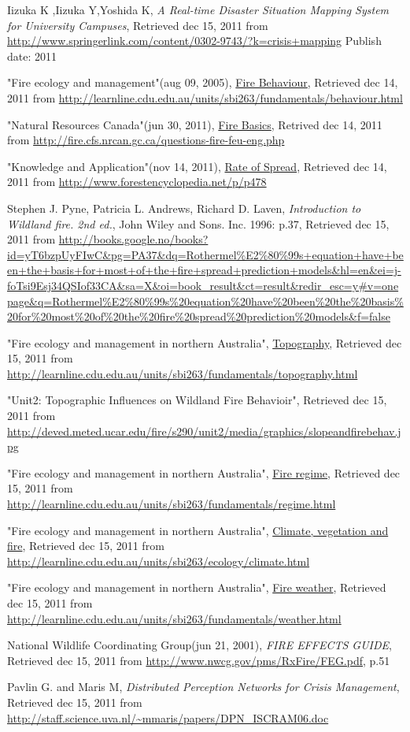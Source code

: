 \begin{thebibliography}{4}
 Iizuka K ,Iizuka Y,Yoshida K, \emph{A Real-time Disaster Situation Mapping System for University Campuses}, Retrieved dec 15, 2011 from \url{http://www.springerlink.com/content/0302-9743/?k=crisis+mapping} Publish date: 2011

 "Fire ecology and management"(aug 09, 2005), \underline{Fire Behaviour}, Retrieved dec 14, 2011 from \url{http://learnline.cdu.edu.au/units/sbi263/fundamentals/behaviour.html}

 "Natural Resources Canada"(jun 30, 2011), \underline{Fire Basics}, Retrived dec 14, 2011 from \url{http://fire.cfs.nrcan.gc.ca/questions-fire-feu-eng.php}

 "Knowledge and Application"(nov 14, 2011), \underline{Rate of Spread}, Retrieved dec 14, 2011 from \url{http://www.forestencyclopedia.net/p/p478}

 Stephen J. Pyne, Patricia L. Andrews, Richard D. Laven, \emph{Introduction to Wildland fire. 2nd ed.}, John Wiley and Sons. Inc. 1996: p.37, Retrieved dec 15, 2011 from
\url{http://books.google.no/books?id=yT6bzpUyFIwC&pg=PA37&dq=Rothermel%E2%80%99s+equation+have+been+the+basis+for+most+of+the+fire+spread+prediction+models&hl=en&ei=j-foTsi9Esj34QSIof33CA&sa=X&oi=book_result&ct=result&redir_esc=y#v=onepage&q=Rothermel%E2%80%99s%20equation%20have%20been%20the%20basis%20for%20most%20of%20the%20fire%20spread%20prediction%20models&f=false}

 "Fire ecology and management in northern Australia", \underline{Topography}, Retrieved dec 15, 2011 from \url{http://learnline.cdu.edu.au/units/sbi263/fundamentals/topography.html}

 "Unit2: Topographic Influences on Wildland Fire Behavioir", Retrieved dec 15, 2011 from \url{http://deved.meted.ucar.edu/fire/s290/unit2/media/graphics/slopeandfirebehav.jpg}

 "Fire ecology and management in northern Australia", \underline{Fire regime}, Retrieved dec 15, 2011 from \url{http://learnline.cdu.edu.au/units/sbi263/fundamentals/regime.html}

 "Fire ecology and management in northern Australia", \underline{Climate, vegetation and fire}, Retrieved dec 15, 2011 from \url{http://learnline.cdu.edu.au/units/sbi263/ecology/climate.html}

 "Fire ecology and management in northern Australia", \underline{Fire weather}, Retrieved dec 15, 2011 from \url{http://learnline.cdu.edu.au/units/sbi263/fundamentals/weather.html}

 National Wildlife Coordinating Group(jun 21, 2001), \emph{FIRE EFFECTS GUIDE}, Retrieved dec 15, 2011 from \url{http://www.nwcg.gov/pms/RxFire/FEG.pdf}, p.51

 Pavlin G. and Maris M, \emph{Distributed Perception Networks for Crisis Management}, Retrieved dec 15, 2011 from \url{http://staff.science.uva.nl/~mmaris/papers/DPN_ISCRAM06.doc}

\end{thebibliography}
